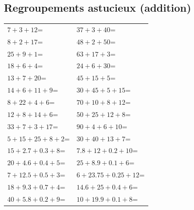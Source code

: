 \documentclass[answers]{exam}
\newcommand{\ex}[1]{#1\;=\;\dotfill}
\begin{document}
\subsection*{Regroupements astucieux (addition)}

\begin{center}
\begin{longtable}{|L|L|}
\hline
\ex{$7 + 3 + 12$} & \ex{$37 + 3 + 40$} \\
\ex{$8 + 2 + 17$} & \ex{$48 + 2 + 50$} \\
\ex{$25 + 9 + 1$} & \ex{$63 + 17 + 3$} \\
\ex{$18 + 6 + 4$} & \ex{$24 + 6 + 30$} \\
\ex{$13 + 7 + 20$} & \ex{$45 + 15 + 5$} \\
\ex{$14 + 6 + 11 + 9$} & \ex{$30 + 45 + 5 + 15$} \\
\ex{$8 + 22 + 4 + 6$} & \ex{$70 + 10 + 8 + 12$} \\
\ex{$12 + 8 + 14 + 6$} & \ex{$50 + 25 + 12 + 8$} \\
\ex{$33 + 7 + 3 + 17$} & \ex{$90 + 4 + 6 + 10$} \\
\ex{$5 + 15 + 25 + 8 + 2$} & \ex{$30 + 40 + 13 + 7$} \\
\ex{$15 + 2.7 + 0.3 + 8$} & \ex{$7.8 + 12 + 0.2 + 10$} \\
\ex{$20 + 4.6 + 0.4 + 5$} & \ex{$25 + 8.9 + 0.1 + 6$} \\
\ex{$7 + 12.5 + 0.5 + 3$} & \ex{$6 + 23.75 + 0.25 + 12$} \\
\ex{$18 + 9.3 + 0.7 + 4$} & \ex{$14.6 + 25 + 0.4 + 6$} \\
\ex{$40 + 5.8 + 0.2 + 9$} & \ex{$10 + 19.9 + 0.1 + 8$} \\
\hline
\end{longtable}
\end{center}
\end{document}
